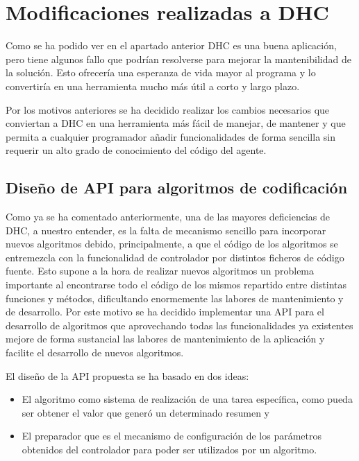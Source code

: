 \section{Modificaciones realizadas a DHC}

Como se ha podido ver en el apartado anterior DHC es una buena aplicación, pero tiene algunos fallo que podrían resolverse para mejorar la mantenibilidad de la solución. Esto ofrecería una esperanza de vida mayor al programa y lo convertiría en una herramienta mucho más útil a corto y largo plazo.

Por los motivos anteriores se ha decidido realizar los cambios necesarios que conviertan a DHC en una herramienta más fácil de manejar, de mantener y que permita a cualquier programador añadir funcionalidades de forma sencilla sin requerir un alto grado de conocimiento del código del agente.

\subsection{Diseño de API para algoritmos de codificación}\label{sec:api_alg}

Como ya se ha comentado anteriormente, una de las mayores deficiencias de DHC, a nuestro entender, es la falta de mecanismo sencillo para incorporar nuevos algoritmos debido, principalmente, a que el código de los algoritmos se entremezcla con la funcionalidad de controlador por distintos ficheros de código fuente. Esto supone a la hora de realizar nuevos algoritmos un problema importante al encontrarse todo el código de los mismos repartido entre distintas funciones y métodos, dificultando enormemente las labores de mantenimiento y de desarrollo. Por este motivo se ha decidido implementar una API para el desarrollo de algoritmos que aprovechando todas las funcionalidades ya existentes mejore de forma sustancial las labores de mantenimiento de la aplicación y facilite el desarrollo de nuevos algoritmos.

El diseño de la API propuesta se ha basado en dos ideas:
\begin{itemize}
	\item El algoritmo como sistema de realización de una tarea específica, como pueda ser obtener el valor que generó un determinado resumen y
	
	\item El preparador que es el mecanismo de configuración de los parámetros obtenidos del controlador para poder ser utilizados por un algoritmo.
\end{itemize}

